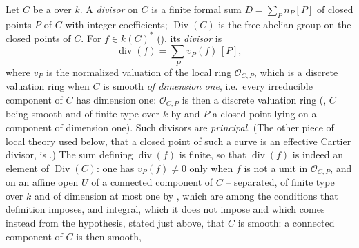 \begin{definition}
\label{def:pcb-divisor}
Let \(C\) be a  over \(k\).  A
\emph{divisor} on \(C\) is a finite formal sum
\(D=\sum_Pn_P[P]\) of closed points \(P\) of \(C\) with integer
coefficients; \(\operatorname{Div}(C)\) is the free abelian group on
the closed points of \(C\).  For \(f\in k(C)^*\)
(), its \emph{divisor} is
\[
 \operatorname{div}(f)=\sum_P v_P(f)\,[P],
\]
where \(v_P\) is the normalized valuation of the local ring
\(\mathcal O_{C,P}\), which is a discrete valuation ring when \(C\) is
smooth \emph{of dimension one}, i.e.\ every irreducible component of
\(C\) has dimension one: \(\mathcal O_{C,P}\) is then a discrete
valuation ring (, \(C\) being
smooth and of finite type over \(k\) by  and
\(P\) a closed point lying on a component of dimension one).
Such divisors are \emph{principal}.  (The other piece of local theory
used below, that a closed point of such a curve is an effective
Cartier divisor, is .)
The sum defining \(\operatorname{div}(f)\) is finite, so that
\(\operatorname{div}(f)\) is indeed an element of
\(\operatorname{Div}(C)\): one has \(v_P(f)\neq0\)
only when \(f\) is not a unit in \(\mathcal O_{C,P}\), and on an affine
open \(U\) of a connected component of \(C\) -- separated, of finite
type over \(k\) and of dimension at most one by ,
which are among the conditions that definition imposes, and integral,
which it does not impose and which comes instead from the hypothesis,
stated just above,
that \(C\) is smooth: a connected component of \(C\) is then smooth,

\end{definition}
